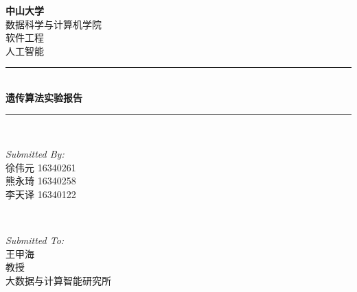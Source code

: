 \begin{titlepage}

\newcommand{\HRule}{\rule{\linewidth}{0.5mm}} %

\center %
 

\textsc{\LARGE \bfseries 中山大学 }\\[0.3cm] %
\textsc{\Large 数据科学与计算机学院}\\[0.5cm] %
\textsc{\Large 软件工程}\\[0.3cm] %
\textsc{\Large 人工智能}\\[0.5cm]


\HRule \\[0.4cm]
{ \huge \bfseries 遗传算法实验报告}\\[0.03cm] %
\HRule \\[1.5cm]

 

\begin{minipage}{0.4\textwidth}
\begin{flushleft} \large
\emph{Submitted By:}\\
徐伟元 16340261\\
熊永琦 16340258\\
李天译 16340122
\end{flushleft}
\end{minipage}
~
\begin{minipage}{0.5\textwidth}
\begin{flushright} \large
\emph{Submitted To:} \\
王甲海\\ 教授\\ 大数据与计算智能研究所 %
\end{flushright}
\end{minipage}\\[1cm]


\end{titlepage}

